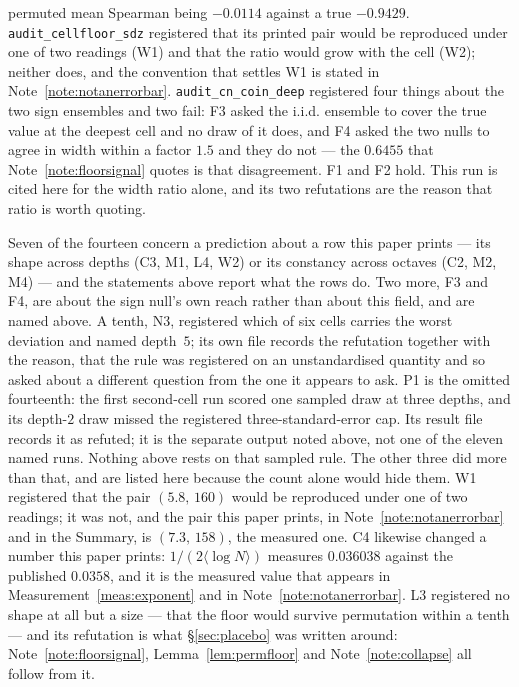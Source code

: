 \documentclass[11pt,a4paper]{article}
\theoremstyle{plain}
\theoremstyle{definition}
\theoremstyle{remark}
\begin{document}
permuted mean Spearman being $-0.0114$ against a true $-0.9429$. \texttt{audit\_cellfloor\_sdz}
registered that its printed pair would be reproduced under one of two
readings (W1) and that the ratio would grow with the cell (W2); neither
does, and the convention that settles W1 is stated in
Note~\ref{note:notanerrorbar}. \texttt{audit\_cn\_coin\_deep}
registered four things about the two sign ensembles and two fail:
F3 asked the i.i.d. ensemble to cover the true value at the
deepest cell and no draw of it does, and F4 asked the two nulls to
agree in width within a factor $1.5$ and they do not --- the
$0.6455$ that Note~\ref{note:floorsignal} quotes is that
disagreement. F1 and F2 hold. This run is cited here for the width
ratio alone, and its two refutations are the reason that ratio is
worth quoting.

Seven of the fourteen concern a prediction about a row this paper
prints --- its shape across depths (C3, M1, L4, W2) or its
constancy across octaves (C2, M2, M4) --- and the statements
above report what the rows do. Two more, F3 and F4, are about the
sign null's own reach rather than about this field, and are
named above. A tenth, N3, registered which of six cells carries the
worst deviation and named depth~$5$; its own file records the
refutation together with the reason, that the rule was registered on
an unstandardised quantity and so asked about a different question
from the one it appears to ask. P1 is the omitted fourteenth: the first
second-cell run scored one sampled draw at three depths, and its
depth-$2$ draw missed the registered three-standard-error cap. Its result
file records it as refuted; it is the separate output noted above, not
one of the eleven named runs. Nothing above rests on that sampled rule.
The other three did more than that, and are listed here because the count alone would
hide them. W1 registered that the pair $(5.8,\,160)$ would be
reproduced under one of two readings; it was not, and the pair this
paper prints, in Note~\ref{note:notanerrorbar} and in the Summary, is
$(7.3,\,158)$, the measured one. C4 likewise changed a number this
paper prints: $1/(2\langle\log N\rangle)$ measures $0.036038$ against
the published $0.0358$, and it is the measured value that appears in
Measurement~\ref{meas:exponent} and in
Note~\ref{note:notanerrorbar}. L3 registered no shape at all but a
size --- that the floor would survive permutation within a tenth ---
and its refutation is what \S\ref{sec:placebo} was written around:
Note~\ref{note:floorsignal}, Lemma~\ref{lem:permfloor} and
Note~\ref{note:collapse} all follow from it.
\end{document}
